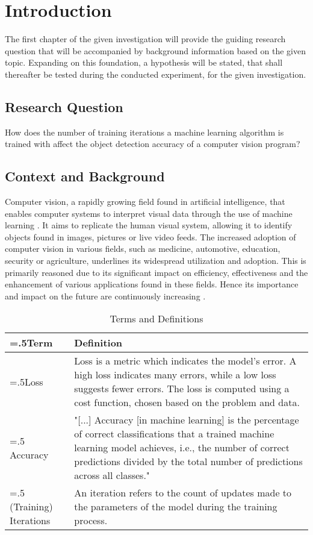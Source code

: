 

\section{Introduction}
The first chapter of the given investigation will provide the guiding research question that will be accompanied by background information based on the given topic. Expanding on this foundation, a hypothesis will be stated, that shall thereafter be tested during the conducted experiment, for the given investigation.

\subsection{Research Question}
How does the number of training iterations a machine learning algorithm is trained with affect the object detection accuracy of a computer vision program?

\subsection{Context and Background}
Computer vision, a rapidly growing field found in artificial intelligence, that enables computer systems to interpret visual data through the use of machine learning \parencite{Sultana2020}. It aims to replicate the human visual system, allowing it to identify objects found in images, pictures or live video feeds. The increased adoption of computer vision in various fields, such as medicine, automotive, education, security or agriculture, underlines its widespread utilization and adoption. This is primarily reasoned due to its significant impact on efficiency, effectiveness and the enhancement of various applications found in these fields. Hence its importance and impact on the future are continuously increasing \parencite{Szeliski2022}. 

\begin{table}[h]
\centering
\begin{tabularx}{\textwidth}{|>{\hsize=.5\hsize}X|>{\hsize=1.5\hsize}X|}
\hline
\textbf{Term} & \textbf{Definition} \\
\hline
Loss & 
Loss is a metric which indicates the model's error. A high loss indicates many errors, while a low loss suggests fewer errors. 
The loss is computed using a cost function, chosen based on the problem and data. \parencite{Baeldung2022}
\\
\hline
Accuracy &
"[...] Accuracy [in machine learning] is the percentage of correct classifications that a trained machine learning model achieves, i.e., 
the number of correct predictions divided by the total number of predictions across all classes." \parencite{Iguazio}
\\
\hline
(Training) Iterations & 
An iteration refers to the count of updates made to the parameters of the model during the training process. \parencite{Paperspace}
\\
\hline

\end{tabularx}
\caption{Terms and Definitions}
\label{tab:terms-and-definitions}
\end{table}

